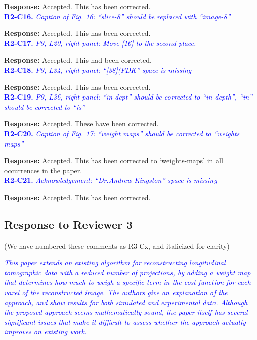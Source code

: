 \documentclass{article}
\begin{document}
 \textbf{Response:} Accepted. This has been corrected.\\

 \textcolor{blue}{\textbf{R2-C16.}\textit{ Caption of Fig. 16: ``slice-8'' should be replaced with ``image-8''}}
 
 \textbf{Response:} Accepted. This has been corrected.\\

 \textcolor{blue}{\textbf{R2-C17.}\textit{ P9, L20, right panel: Move [16] to the second place.   }}
 
 \textbf{Response:} Accepted. This had been corrected.\\

\textcolor{blue}{\textbf{R2-C18.}\textit{ P9, L34, right panel: ``[38](FDK'' space is missing}}
 
 \textbf{Response:} Accepted. This has been corrected.\\

 \textcolor{blue}{\textbf{R2-C19.}\textit{ P9, L36, right panel: ``in-dept'' should be corrected to ``in-depth'', ``in'' should be corrected to ``is''}}
 
 \textbf{Response:} Accepted. These have been corrected.\\

 \textcolor{blue}{\textbf{R2-C20.}\textit{ Caption of Fig. 17: ``weight maps'' should be corrected to ``weights maps''}}
 
\textbf{Response:} Accepted. This has been corrected to `weights-maps' in all occurrences in the paper.\\

 \textcolor{blue}{\textbf{R2-C21.}\textit{ Acknowledgement: ``Dr.Andrew Kingston'' space is missing}}
 
\textbf{Response:} Accepted. This has been corrected.      

\subsection{Response to Reviewer 3}
(We have numbered these comments as R3-Cx, and italicized for clarity)

\textcolor{blue}{\textit{This paper extends an existing algorithm for reconstructing longitudinal tomographic data with a reduced number of projections, by adding a weight map that determines how much to weigh a specific term in the cost function for each voxel of the reconstructed image. The authors give an explanation of the approach, and show results for both simulated and experimental data. Although the proposed approach seems mathematically sound, the paper itself has several significant issues that make it difficult to assess whether the approach actually improves on existing work. }}\\
\end{document}

